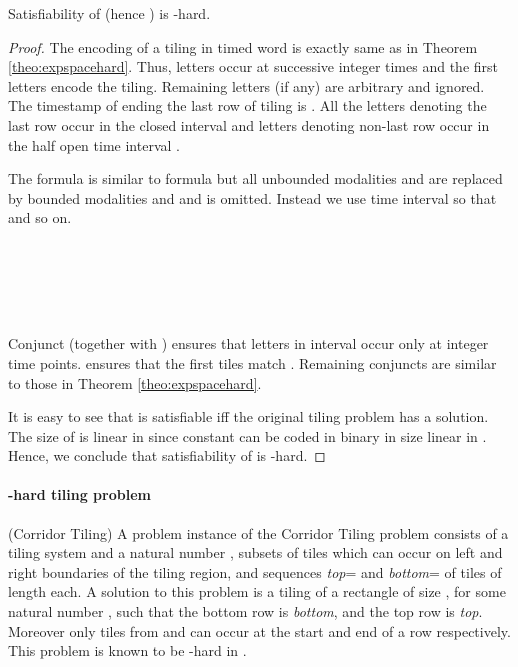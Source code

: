 \documentclass{llncs}
\newcommand{\pspace}{\mbox{}}
\newcommand{\nexptime}{\mbox{}}
\begin{document}
\begin{theorem} 
\label{theo:nexptimehard} Satisfiability of  (hence
)  is \nexptime-hard.
\end{theorem}
\begin{proof}
The encoding of a tiling in timed word is exactly same as in Theorem \ref{theo:expspacehard}. Thus, letters occur at successive integer times and
the first  letters encode
the tiling. Remaining letters (if any) are arbitrary and ignored. 
The timestamp of  ending the last row of tiling is . All the letters denoting the last row occur in the closed interval  and letters denoting non-last row occur in the half open time interval . 

The formula  is  similar to formula  but
all unbounded modalities  and  are replaced by bounded modalities  and  and  is omitted. Instead we use time interval  so that  and so on.
\medskip

\noindent
\\
\\
\\
\\

\medskip

Conjunct  (together with ) ensures that letters in interval  occur only at integer time points.  ensures that the first  tiles match . Remaining conjuncts are similar to those in Theorem \ref{theo:expspacehard}.


It is easy to see that  is satisfiable iff the original tiling problem 
has a solution. The size of  is linear in  since constant  
can be coded in binary in size linear in . Hence, we  conclude that satisfiability 
of  is \nexptime-hard. 
\end{proof}


\paragraph{\pspace-hard tiling problem} (Corridor Tiling) A problem instance of the Corridor Tiling problem consists of a tiling system  and a natural number , subsets  of tiles which can occur on left and right boundaries of the tiling region, and sequences \textit{top}= and \textit{bottom}= of tiles of length  each. A solution to this problem is a tiling  of a rectangle of size , for some natural number , such that the bottom row is \textit{bottom}, and the top row is \textit{top}. Moreover only tiles from  and  can occur at the start and end of a row respectively. This problem is known to be \pspace-hard in .
\end{document}
